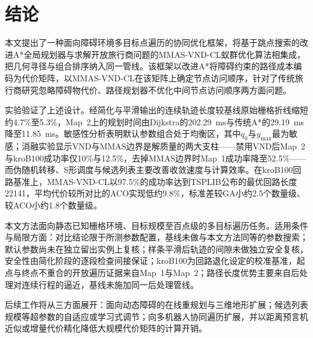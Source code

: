 \documentclass[lettersize,journal]{IEEEtran}
\begin{document}
\section{结论}

\label{sec:concl}

本文提出了一种面向障碍环境多目标点遍历的协同优化框架，将基于跳点搜索的改进A*全局规划器与求解开放旅行商问题的MMAS-VND-CL蚁群优化算法相集成，把几何寻径与组合排序纳入同一管线。该框架以改进A*将障碍约束的路径成本编码为代价矩阵，以MMAS-VND-CL在该矩阵上确定节点访问顺序，针对了传统旅行商研究忽略障碍物代价、路径规划器不优化中间节点访问顺序两方面问题。

实验验证了上述设计。经简化与平滑输出的连续轨迹长度较基线原始栅格折线缩短约4.7\%至5.3\%，Map~2上的规划时间由Dijkstra的202.29~ms与传统A*的29.19~ms降至11.85~ms。敏感性分析表明默认参数组合处于均衡区，其中$q_0$与$y_{\max}$最为敏感；消融实验显示VND与MMAS边界是解质量的两大支柱——禁用VND后Map~2与kroB100成功率仅10\%与12.5\%，去掉MMAS边界时Map~1成功率降至52.5\%——而伪随机转移、S形调度与候选列表主要改善收敛速度与计算效率。在kroB100回路基准上，MMAS-VND-CL以97.5\%的成功率达到TSPLIB公布的最优回路长度22141，平均代价较所对比的ACO实现低约9.8\%，标准差较GA小约2.5个数量级、较ACO小约1.8个数量级。

本文方法面向静态已知栅格环境、目标规模至百点级的多目标遍历任务。适用条件与局限方面：对比结论限于所测参数配置，基线未做与本文方法同等的参数搜索；默认参数尚未在独立留出实例上复核；样条平滑后轨迹的间隙未做独立安全复核，安全性由简化阶段的逐段检查间接保证；kroB100为回路退化设定的校准基准，起点与终点不重合的开放遍历证据来自Map~1与Map~2；路径长度优势主要来自后处理对连续行程的逼近，基线未施加同一后处理管线。

后续工作将从三方面展开：面向动态障碍的在线重规划与三维地形扩展；候选列表规模等超参数的自适应或学习式调节；向多机器人协同遍历扩展，并以距离预言机近似或增量代价精化降低大规模代价矩阵的计算开销。
\end{document}
